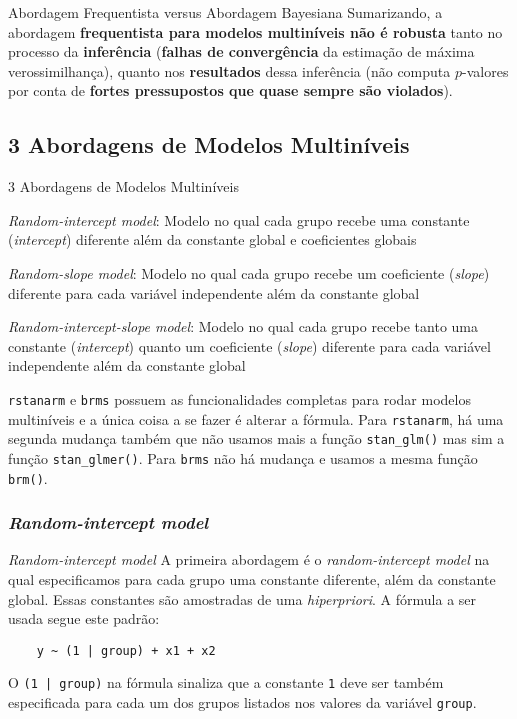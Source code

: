 \begin{frame}{Abordagem Frequentista versus Abordagem Bayesiana}
  Sumarizando, a abordagem \textbf{frequentista para modelos multiníveis não é robusta}
  tanto no processo da \textbf{inferência} (\textbf{falhas de convergência}
  da estimação de máxima verossimilhança), quanto nos \textbf{resultados} dessa
  inferência (não computa $p$-valores por conta de \textbf{fortes pressupostos
  que quase sempre são violados}).
\end{frame}

\subsection{3 Abordagens de Modelos Multiníveis}

\begin{frame}{3 Abordagens de Modelos Multiníveis}
  \begin{vfilleditems}
    \item \textit{Random-intercept model}: Modelo no qual cada grupo recebe uma
    constante (\textit{intercept}) diferente além da constante global e coeficientes
    globais
    \item \textit{Random-slope model}: Modelo no qual cada grupo recebe um coeficiente
    (\textit{slope}) diferente para cada variável independente além da constante global
    \item \textit{Random-intercept-slope model}: Modelo no qual cada grupo recebe tanto
    uma constante (\textit{intercept}) quanto um coeficiente (\textit{slope})
    diferente para cada variável independente além da constante global
  \end{vfilleditems}
  \small
  \texttt{rstanarm} e \texttt{brms} possuem as funcionalidades completas para rodar
  modelos multiníveis e a única coisa a se fazer é alterar a fórmula. Para
  \texttt{rstanarm}, há uma segunda mudança também que não usamos mais a função
  \texttt{stan\_glm()} mas sim a função \texttt{stan\_glmer()}. Para \texttt{brms}
  não há mudança e usamos a mesma função \texttt{brm()}.
\end{frame}

\subsubsection{\textit{Random-intercept model}}
\begin{frame}[fragile]{\textit{Random-intercept model}}
  A primeira abordagem é o \textit{random-intercept model} na qual especificamos
  para cada grupo uma constante diferente, além da constante global. Essas constantes
  são amostradas de uma \textit{hiperpriori}.
  \vfill
  A fórmula a ser usada segue este padrão:
  \begin{lstlisting}
    y ~ (1 | group) + x1 + x2
  \end{lstlisting}
  \vfill
  O \texttt{(1 | group)} na fórmula sinaliza que a constante \texttt{1}
  deve ser também especificada para cada um dos grupos listados nos valores
  da variável \texttt{group}.
\end{frame}

